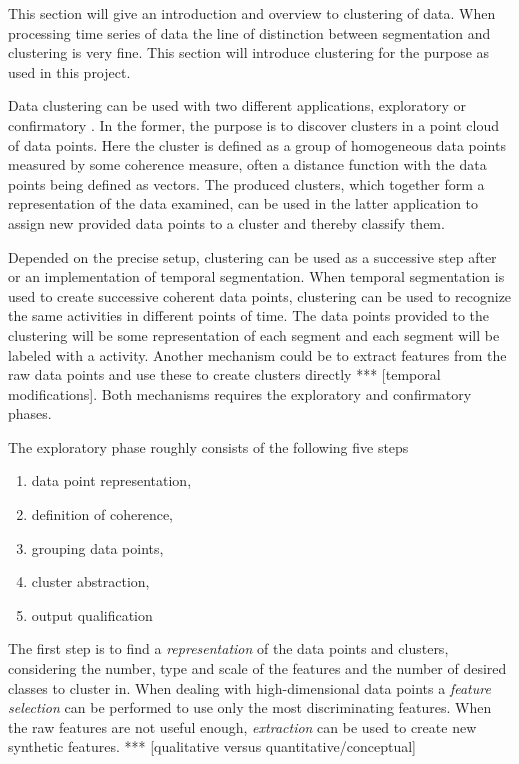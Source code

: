 This section will give an introduction and overview to clustering of data. 
When processing time series of data the line of distinction between 
segmentation and clustering is very fine. This section will introduce 
clustering for the purpose as used in this project.

Data clustering can be used with two different applications, exploratory or 
confirmatory \cite{jain1999data}. In the former, the purpose is to discover 
clusters in a point cloud of data points. Here the cluster is defined as a 
group of homogeneous data points measured by some coherence measure, often a 
distance function with the data points being defined as vectors. The produced 
clusters, which together form a representation of the data examined, can be 
used in the 
latter application to assign new provided data points to a cluster and thereby 
classify them.

Depended on the precise setup, clustering can be used as a successive step 
after or an implementation of temporal segmentation. When temporal 
segmentation is used to create successive coherent data points, clustering can 
be used to recognize the same activities in different points of time. The data 
points provided to the clustering will be some representation of each segment 
and each segment will be labeled with a activity. Another mechanism could be 
to extract features from the raw data points and use these to create clusters 
directly *** [temporal modifications]. Both mechanisms requires the 
exploratory and confirmatory phases.

The exploratory phase roughly consists of the following five steps 
\cite{jain1999data}
\begin{enumerate}
	\item data point representation,
	\item definition of coherence,
	\item grouping data points,
	\item cluster abstraction,
	\item output qualification
\end{enumerate}

The first step is to find a \emph{representation} of the data points and 
clusters, considering the number, type and scale of the features and the 
number of desired classes to cluster in. When dealing with high-dimensional 
data points a \emph{feature selection} can be performed to use only the most 
discriminating features. When the raw features are not useful enough, 
\emph{extraction} can be used to create new synthetic features. *** 
[qualitative versus quantitative/conceptual]


